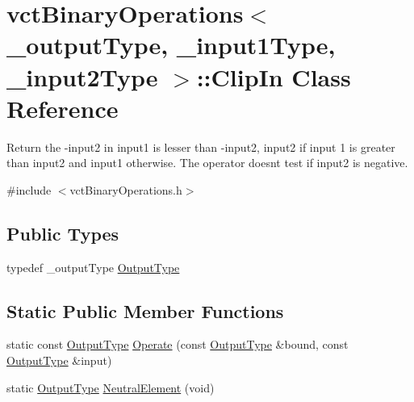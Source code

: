 \hypertarget{classvct_binary_operations_1_1_clip_in}{}\section{vct\+Binary\+Operations$<$ \+\_\+output\+Type, \+\_\+input1\+Type, \+\_\+input2\+Type $>$\+:\+:Clip\+In Class Reference}
\label{classvct_binary_operations_1_1_clip_in}


Return the -\/input2 in input1 is lesser than -\/input2, input2 if input 1 is greater than input2 and input1 otherwise. The operator doesn\textquotesingle{}t test if input2 is negative.  




{\ttfamily \#include $<$vct\+Binary\+Operations.\+h$>$}

\subsection*{Public Types}
\begin{DoxyCompactItemize}
\item 
typedef \+\_\+output\+Type \hyperlink{classvct_binary_operations_1_1_clip_in_ad09cdc8a73a37ea74b60e83b670db658}{Output\+Type}
\end{DoxyCompactItemize}
\subsection*{Static Public Member Functions}
\begin{DoxyCompactItemize}
\item 
static const \hyperlink{classvct_binary_operations_1_1_clip_in_ad09cdc8a73a37ea74b60e83b670db658}{Output\+Type} \hyperlink{classvct_binary_operations_1_1_clip_in_ae382f87132537d0660cb74de43c7f3d3}{Operate} (const \hyperlink{classvct_binary_operations_1_1_clip_in_ad09cdc8a73a37ea74b60e83b670db658}{Output\+Type} \&bound, const \hyperlink{classvct_binary_operations_1_1_clip_in_ad09cdc8a73a37ea74b60e83b670db658}{Output\+Type} \&input)
\item 
static \hyperlink{classvct_binary_operations_1_1_clip_in_ad09cdc8a73a37ea74b60e83b670db658}{Output\+Type} \hyperlink{classvct_binary_operations_1_1_clip_in_ab758c32bbb4a9a69c5ef1e2186d4f222}{Neutral\+Element} (void)
\end{DoxyCompactItemize}


